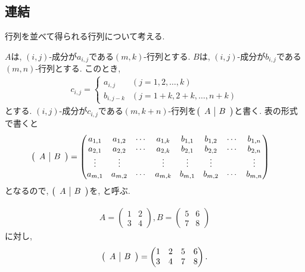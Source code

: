 \subsection{連結}
行列を並べて得られる行列について考える.
\begin{definition}
  $A$は, $(i,j)$-成分が$a_{i,j}$である$(m,k)$-行列とする.
  $B$は, $(i,j)$-成分が$b_{i,j}$である$(m,n)$-行列とする.  
  このとき,
  \begin{align*}
    c_{i,j}=
    \begin{cases}
      a_{i,j} &(j=1,2,\ldots,k)\\
      b_{i,j-k}&(j=1+k,2+k,\ldots,n+k)
    \end{cases}
  \end{align*}
  とする.
  $(i,j)$-成分が$c_{i,j}$である$(m,k+n)$-行列を$\left(\begin{array}{c|c}A& B\end{array}\right)$と書く.
  表の形式で書くと
  \begin{align*}
    \left(\begin{array}{c|c}A& B\end{array}\right)
    &=
    \begin{pmatrix}
      a_{1,1}&a_{1,2}&\cdots&a_{1,k}&b_{1,1}&b_{1,2}&\cdots&b_{1,n}\\
      a_{2,1}&a_{2,2}&\cdots&a_{2,k}&b_{2,1}&b_{2,2}&\cdots&b_{2,n}\\
      \vdots&\vdots&&\vdots&\vdots&\vdots&&\vdots\\
      a_{m,1}&a_{m,2}&\cdots&a_{m,k}&b_{m,1}&b_{m,2}&\cdots&b_{m,n}
    \end{pmatrix}
  \end{align*}
  となるので,
  $\left(\begin{array}{c|c}A& B\end{array}\right)$を,
  と呼ぶ. 
\end{definition}

\begin{example}
  \begin{align*}
    A=\begin{pmatrix}1&2\\3&4\end{pmatrix},
    B=\begin{pmatrix}5&6\\7&8\end{pmatrix}
  \end{align*}
  に対し,
  \begin{align*}
    \left(\begin{array}{c|c}A& B\end{array}\right)=
    \begin{pmatrix}1&2&5&6\\3&4&7&8\end{pmatrix}.
  \end{align*}
\end{example}



